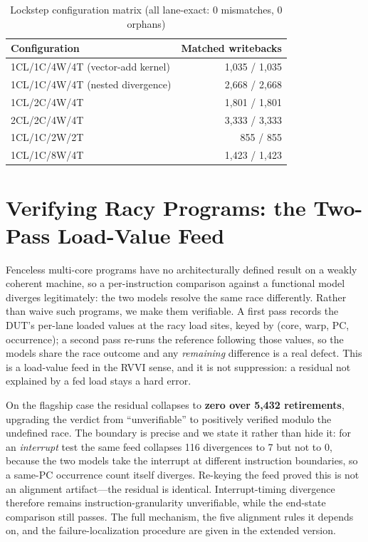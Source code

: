 \documentclass[conference]{IEEEtran}
\begin{document}
\begin{table}[t]
\caption{Lockstep configuration matrix (all lane-exact: 0 mismatches,
0 orphans)}
\label{tab:matrix}
\centering
\small
\begin{tabular}{lr}
\toprule
Configuration & Matched writebacks \\
\midrule
1CL/1C/4W/4T (vector-add kernel) & 1{,}035 / 1{,}035 \\
1CL/1C/4W/4T (nested divergence) & 2{,}668 / 2{,}668 \\
1CL/2C/4W/4T & 1{,}801 / 1{,}801 \\
2CL/2C/4W/4T & 3{,}333 / 3{,}333 \\
1CL/1C/2W/2T & 855 / 855 \\
1CL/1C/8W/4T & 1{,}423 / 1{,}423 \\
\bottomrule
\end{tabular}
\end{table}

\section{Verifying Racy Programs: the Two-Pass Load-Value Feed}
\label{sec:loadfeed}

Fenceless multi-core programs have no architecturally defined result on a
weakly coherent machine, so a per-instruction comparison against a
functional model diverges legitimately: the two models resolve the same
race differently. Rather than waive such programs, we make them
verifiable. A first pass records the DUT's per-lane loaded values at the
racy load sites, keyed by (core, warp, PC, occurrence); a second pass
re-runs the reference following those values, so the models share the
race outcome and any \emph{remaining} difference is a real defect. This
is a load-value feed in the RVVI sense, and it is not suppression: a
residual not explained by a fed load stays a hard error.

On the flagship case the residual collapses to \textbf{zero over 5{,}432
retirements}, upgrading the verdict from ``unverifiable'' to positively
verified modulo the undefined race. The boundary is precise and we state
it rather than hide it: for an \emph{interrupt} test the same feed
collapses 116 divergences to 7 but not to 0, because the two models take
the interrupt at different instruction boundaries, so a same-PC
occurrence count itself diverges. Re-keying the feed proved this is not
an alignment artifact---the residual is identical. Interrupt-timing
divergence therefore remains instruction-granularity unverifiable, while
the end-state comparison still passes. The full mechanism, the five
alignment rules it depends on, and the failure-localization procedure are
given in the extended version.
\end{document}
